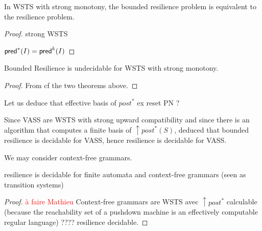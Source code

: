 \begin{proposition}
In WSTS with strong monotony, the bounded resilience problem is
equivalent to the resilience problem.
\end{proposition}

\begin{proof}
strong WSTS

$\textsf{pred}^*(I) = \textsf{pred}^{k}(I)$

\end{proof}

\begin{corollary}
Bounded Resilience is undecidable for WSTS with strong monotony.
\end{corollary}

\begin{proof} 
  From
  cf
the two  theorems above. 
\end{proof}



Let us deduce that effective basis of $post^*$ ex reset PN ?

Since VASS are WSTS with strong upward compatibility and since there is an algorithm that computes a finite basis of  $\uparrow post^*(S)$, \cite{DBLP:conf/gg/Ozkan22} deduced that bounded resilience is decidable for VASS, hence resilience is decidable for VASS. 

We may consider context-free grammars.

\begin{corollary}
{\sc resilience} is decidable for finite automata and context-free grammars (seen as transition systems)
\end{corollary}

\begin{proof}

  \textcolor{red}{à faire Mathieu}
Context-free grammars are WSTS \cite{DBLP:journals/tcs/FinkelS01} avec $\uparrow post^*$ calculable (because the reachability set of a pushdown machine is an effectively computable regular language) ???? resilience decidable.
\end{proof}


\cite{DBLP:journals/ipl/BouajjaniEFMRWW00}


